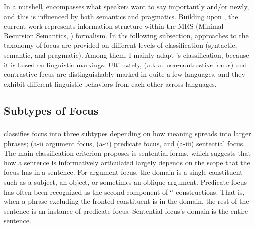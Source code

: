 

\noindent In a nutshell,  encompasses what speakers want to say
importantly and/or newly, and this is influenced by both semantics and
pragmatics.  Building upon , the current work
represents information structure within the MRS (Minimal
Recursion Semantics, \citealt{copestake:etal:05}) formalism.  In the
following subsection, approaches to the taxonomy of focus are provided
on different levels of classification (syntactic, semantic, and
pragmatic). Among them, I mainly adapt \citet{gundel:99}'s
classification, because it is based on linguistic
markings. Ultimately, 
(a.k.a.\ non-contrastive focus)
and contrastive focus are distinguishably marked in quite a few
languages, and they exhibit different linguistic behaviors from each
other across languages.




\subsection{Subtypes of Focus}
\label{3:ssec:subtypes-focus}


\subsubsection{\citet{lambrecht:96}}
\label{3:sssec:lambrecht}

\citeauthor{lambrecht:96} classifies focus into three subtypes
depending on how  meaning spreads into larger phrases; (a-i)
argument focus, (a-ii) predicate focus, and (a-iii) sentential
focus. The main classification criterion \citeauthor{lambrecht:96}
proposes is sentential forms, which suggests that how a sentence is
informatively articulated largely depends on the scope that the focus
has in a sentence.  For argument focus, the domain is a single
constituent such as a subject, an object, or sometimes an oblique
argument.  Predicate focus has often been recognized as the second
component of `' constructions. That is, when a phrase
excluding the fronted constituent is in the  domain, the rest of
the sentence is an instance of predicate focus.  Sentential focus's
domain is the entire sentence.


